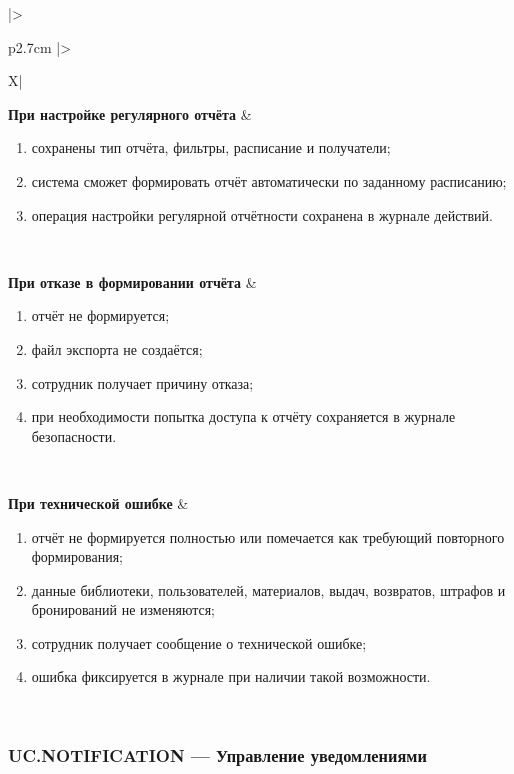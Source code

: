 \documentclass[12pt,a4paper]{article}
\begin{document}
\begin{xltabular}{\textwidth}{
				|>{\raggedright\arraybackslash}p{2.7cm}
				|>{\raggedright\arraybackslash}X|
			}
			\textbf{При настройке регулярного отчёта} &
			\begin{enumerate}
				\item сохранены тип отчёта, фильтры, расписание и получатели;
				\item система сможет формировать отчёт автоматически по заданному
				расписанию;
				\item операция настройки регулярной отчётности сохранена в журнале
				действий.
			\end{enumerate} \\
			\hline
			
			\textbf{При отказе в формировании отчёта} &
			\begin{enumerate}
				\item отчёт не формируется;
				\item файл экспорта не создаётся;
				\item сотрудник получает причину отказа;
				\item при необходимости попытка доступа к отчёту сохраняется в журнале
				безопасности.
			\end{enumerate} \\
			\hline
			
			\textbf{При технической ошибке} &
			\begin{enumerate}
				\item отчёт не формируется полностью или помечается как требующий
				повторного формирования;
				\item данные библиотеки, пользователей, материалов, выдач, возвратов,
				штрафов и бронирований не изменяются;
				\item сотрудник получает сообщение о технической ошибке;
				\item ошибка фиксируется в журнале при наличии такой возможности.
			\end{enumerate} \\
			\hline
			
		\end{xltabular}
		
		\label{tab:uc-reporting-specification}
		\clearpage
		
		\subsubsection{UC.NOTIFICATION --- Управление уведомлениями}
		
\end{document}
